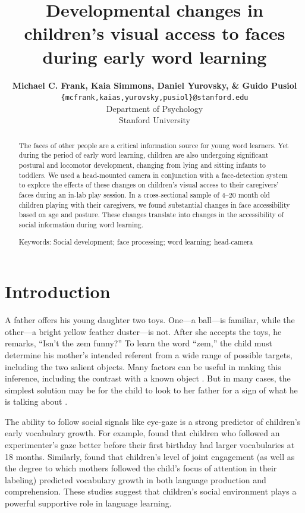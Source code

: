 \documentclass[10pt,letterpaper]{article}
\title{Developmental changes in children's visual access to faces during early word learning}
\author{{\large \bf Michael C. Frank, Kaia Simmons, Daniel Yurovsky, \& Guido Pusiol} \\
\texttt{\{mcfrank,kaias,yurovsky,pusiol\}@stanford.edu} \\
Department of Psychology \\
Stanford University}
\begin{document}
\maketitle

\begin{abstract} 

The faces of other people are a critical information source for young word learners. Yet during the period of early word learning, children are also undergoing significant postural and locomotor development, changing from lying and sitting infants to toddlers. We used a head-mounted camera in conjunction with a face-detection system to explore the effects of these changes on children's visual access to their caregivers' faces during an in-lab play session. In a cross-sectional sample of 4--20 month old children playing with their caregivers, we found substantial changes in face accessibility based on age and posture. These changes translate into changes in the accessibility of social information during word learning. 

{Keywords:} Social development; face processing; word learning; head-camera 
\end{abstract}

\section{Introduction}

A father offers his young daughter two toys. One---a ball---is familiar, while the other---a bright yellow feather duster---is not. After she accepts the toys, he remarks, ``Isn’t the zem funny?'' To learn the word ``zem,'' the child must determine his mother’s intended referent from a wide range of possible targets, including the two salient objects. Many factors can be useful in making this inference, including the contrast with a known object \cite{markman1988,clark1988}. But in many cases, the simplest solution may be for the child to look to her father for a sign of what he is talking about \cite{baldwin1991,vaish2011}.

The ability to follow social signals like eye-gaze is a strong predictor of children's early vocabulary growth. For example,  found that children who followed an experimenter's gaze better before their first birthday had larger vocabularies at 18 months. Similarly,  found that children's level of joint engagement (as well as the degree to which mothers followed the child's focus of attention in their labeling) predicted vocabulary growth in both language production and comprehension. These studies suggest that children's social environment plays a powerful supportive role in language learning. 
\end{document}
